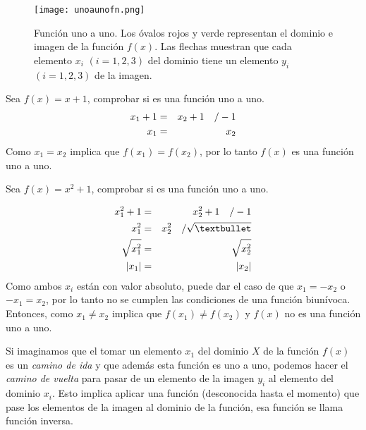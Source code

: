 \begin{center}
\begin{figure}[h!]
\centering
\texttt{[image: unoaunofn.png]}
\caption[Función uno a uno.]{Función uno a uno. Los óvalos rojos y verde representan el dominio e imagen de la función $f(x)$. Las flechas muestran que cada elemento $x_{i}$ $(i=1,2,3)$ del dominio tiene un elemento $y_{i}$ $(i=1,2,3)$ de la imagen.} \label{unafn}
\end{figure}
\end{center}
\begin{myexample}
Sea $f(x)=x+1$, comprobar si es una función uno a uno.
\begin{eqnarray*}
x_{1}+1&=&x_{2}+1 \hspace{10px} \slash -1 \\
x_{1}&=&x_{2}
\end{eqnarray*}
Como $x_{1}=x_{2}$ implica que $f(x_{1})=f(x_{2})$, por lo tanto $f(x)$ es una función uno a uno.
\end{myexample}

\begin{myexample}
Sea $f(x)=x^{2}+1$, comprobar si es una función uno a uno.

\begin{eqnarray*}
x_{1}^{2}+1&=&x_{2}^{2}+1 \hspace{10px} \slash -1 \\
x_{1}^{2}&=&x_{2}^{2}  \hspace{10px} \slash \sqrt{•}\\
\sqrt{x_{1}^{2}}&=&\sqrt{x_{2}^{2}}\\
|x_{1}|&=&|x_{2}|\\
\end{eqnarray*}
Como ambos $x_{i}$ están con valor absoluto, puede dar el caso de que $x_{1}=-x_{2}$ o $-x_{1}=x_{2}$, por lo tanto no se cumplen las condiciones de una función biunívoca. Entonces, como $x_{1}\neq x_{2}$ implica que $f(x_{1})\neq f(x_{2})$ y $f(x)$ no es una función uno a uno.
\end{myexample}

Si imaginamos que el tomar un elemento $x_{1}$ del dominio $X$ de la función $f(x)$ es un \textit{camino de ida} y que además esta función es uno a uno, podemos hacer el \textit{camino de vuelta} para pasar de un elemento de la imagen $y_{i}$ al elemento del dominio $x_{i}$. Esto implica aplicar una función (desconocida hasta el momento) que pase los elementos de la imagen al dominio de la función, esa función se llama función inversa.


